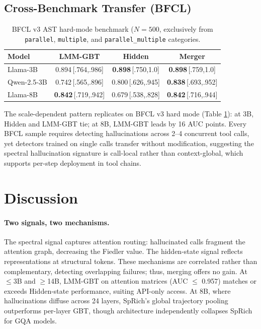 \documentclass{article}
\begin{document}
\subsection{Cross-Benchmark Transfer (BFCL)}

\begin{table}[t]
\centering
\setlength{\tabcolsep}{2pt}
\caption{BFCL v3 AST hard-mode benchmark \cite{patil2025bfcl} ($N{=}500$, exclusively from \texttt{parallel}, \texttt{multiple}, and \texttt{parallel\_multiple} categories.}
\label{tab:bfcl}
\footnotesize
\begin{tabular}{lccc}
\toprule
Model & LMM-GBT & Hidden & Merger \\
\midrule
Llama-3B     & 0.894\,\tiny{[.764,.986]} & \textbf{0.898}\,\tiny{[.750,1.0]} & \textbf{0.898}\,\tiny{[.759,1.0]} \\
Qwen-2.5-3B & 0.742\,\tiny{[.565,.896]} & 0.800\,\tiny{[.626,.945]} & \textbf{0.838}\,\tiny{[.693,.952]} \\
Llama-8B     & \textbf{0.842}\,\tiny{[.719,.942]} & 0.679\,\tiny{[.538,.828]} & \textbf{0.842}\,\tiny{[.716,.944]} \\
\bottomrule
\end{tabular}
\end{table}

The scale-dependent pattern replicates on BFCL v3 hard mode
(Table \ref{tab:bfcl}): at 3B, Hidden and LMM-GBT tie; at 8B,
LMM-GBT leads by 16 AUC points.  Every BFCL sample requires detecting
hallucinations across 2--4 concurrent tool calls, yet detectors trained
on single calls transfer without modification, suggesting the
spectral hallucination signature is call-local rather than
context-global, which supports per-step deployment in tool chains.

\section{Discussion}
\label{sec:discussion}

\paragraph{Two signals, two mechanisms.}
The spectral signal captures attention routing: hallucinated calls fragment the attention graph, decreasing the Fiedler value. The hidden-state signal reflects representations at structural tokens. These mechanisms are correlated rather than complementary, detecting overlapping failures; thus, merging offers no gain. At ${\leq}$3B and ${\geq}$14B, LMM-GBT on attention matrices (AUC $\leq$ 0.957) matches or exceeds Hidden-state performance, suiting API-only access. At 8B, where hallucinations diffuse across 24 layers, SpRich's global trajectory pooling outperforms per-layer GBT, though architecture independently collapses SpRich for GQA models.
\end{document}
